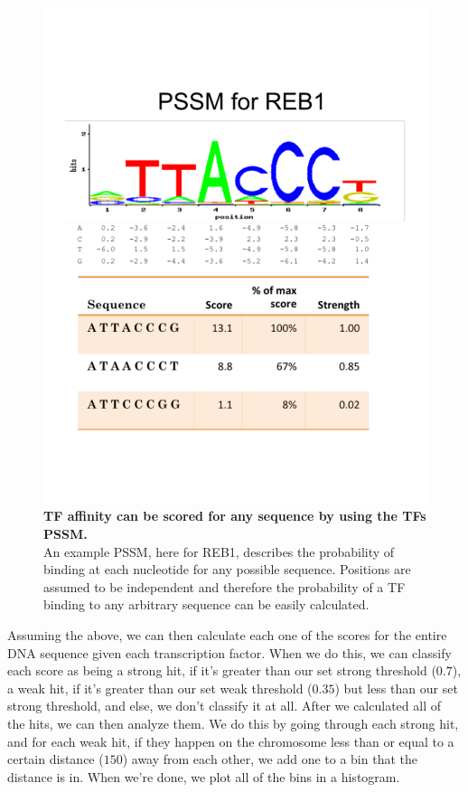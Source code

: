 \documentclass{article}
\newcommand{\tab}{\hspace{9mm}}
\begin{document}
\begin{figure}[H]
  \centering
  \includegraphics[scale=0.29]{pssm_reb1.pdf}
  \caption{\textbf{TF affinity can be scored for any sequence by using the TFs PSSM.}\\An example PSSM, here for REB1, describes the probability of binding at each nucleotide for any possible sequence. Positions are assumed to be independent and therefore the probability of a TF binding to any arbitrary sequence can be easily calculated.}
  \label{fig:example}
\end{figure}

\tab Assuming the above, we can then calculate each one of the scores for the entire DNA sequence given each transcription factor. When we do this, we can classify each score as being a strong hit, if it's greater than our set strong threshold ($0.7$), a weak hit, if it's greater than our set weak threshold ($0.35$) but less than our set strong threshold, and else, we don't classify it at all. After we calculated all of the hits, we can then analyze them. We do this by going through each strong hit, and for each weak hit, if they happen on the chromosome less than or equal to a certain distance ($150$) away from each other, we add one to a bin that the distance is in. When we're done, we plot all of the bins in a histogram.
\end{document}
